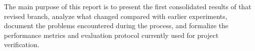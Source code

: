 The main purpose of this report is to present the first consolidated results of
that revised branch, analyze what changed compared with earlier experiments,
document the problems encountered during the process, and formalize the
performance metrics and evaluation protocol currently used for project
verification.
